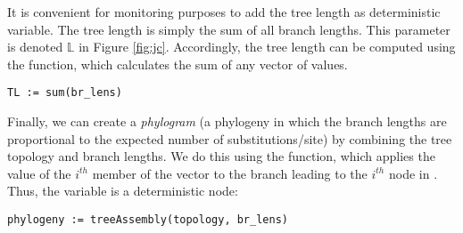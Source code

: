 It is convenient for monitoring purposes to add the tree length as deterministic variable. The tree length is simply the sum of all branch lengths. This parameter is denoted $\mathbb{L}$ in Figure \ref{fig:jc}.
Accordingly, the tree length can be computed using the  function, which calculates the sum of any vector of values.
{\tt \begin{snugshade*}
\begin{lstlisting}
TL := sum(br_lens)
\end{lstlisting}
\end{snugshade*}}

Finally, we can create a \emph{phylogram} (a phylogeny in which the branch lengths are proportional to the expected number of substitutions/site) by combining the tree topology and branch lengths.
We do this using the  function, which applies the value of the $i^{th}$ member of the  vector to the branch leading to the $i^{th}$ node in . 
Thus, the  variable is a deterministic node: 

{\tt \begin{snugshade*}
\begin{lstlisting}
phylogeny := treeAssembly(topology, br_lens)
\end{lstlisting}
\end{snugshade*}}

